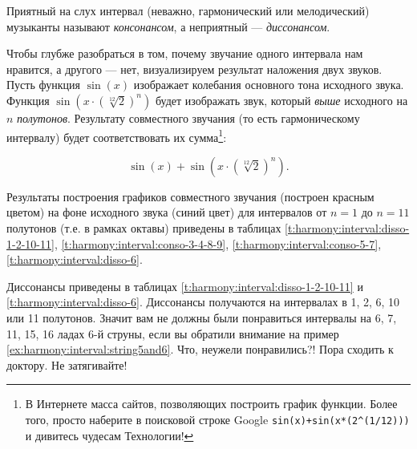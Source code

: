 Приятный на слух интервал (неважно, гармонический или мелодический) музыканты называют \emph{консонансом}, а неприятный --- \emph{диссонансом}. 

Чтобы глубже разобраться в том, почему звучание одного интервала нам нравится, а другого --- нет, визуализируем результат наложения двух звуков. Пусть функция $\sin(x)$ изображает колебания основного тона исходного звука. Функция $\sin(x\cdot(\sqrt[12]{2})^n)$ будет изображать звук, который \emph{выше} исходного на $n$ \emph{полутонов}. Результату совместного звучания (то есть гармоническому интервалу) будет соответствовать их сумма\footnote{В Интернете масса сайтов, позволяющих построить график функции. Более того, просто наберите в поисковой строке Google \texttt{sin(x)+sin(x*(2\^{}(1/12)))} и дивитесь чудесам Технологии!}:

\begin{equation}
    \label{eq:harmony:interval:sin}
    \sin(x) + \sin(x\cdot(\sqrt[12]{2})^n).
\end{equation}

Результаты построения графиков совместного звучания (построен красным цветом) на фоне исходного звука (синий цвет) для интервалов от $n=1$ до $n=11$ полутонов (т.е. в рамках октавы) приведены в таблицах \ref{t:harmony:interval:disso-1-2-10-11}, \ref{t:harmony:interval:conso-3-4-8-9}, \ref{t:harmony:interval:conso-5-7}, \ref{t:harmony:interval:disso-6}.

Диссонансы приведены в таблицах \ref{t:harmony:interval:disso-1-2-10-11} и \ref{t:harmony:interval:disso-6}. Диссонансы получаются на интервалах в 1, 2, 6, 10 или 11 полутонов. Значит вам не должны были понравиться интервалы на 6, 7, 11, 15, 16 ладах 6-й струны, если вы обратили внимание на пример \ref{ex:harmony:interval:string5and6}. Что, неужели понравились?! Пора сходить к доктору. Не затягивайте!

